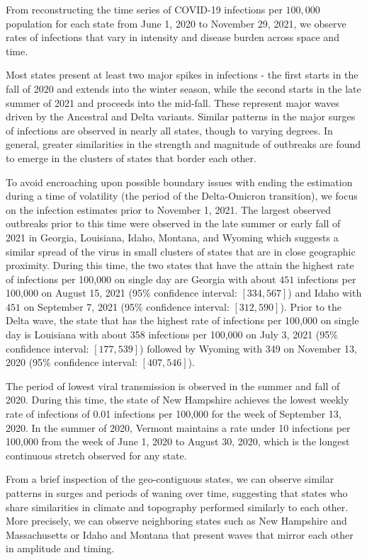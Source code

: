 \documentclass{article}
\begin{document}
From reconstructing the time series of COVID-19 infections per $100,000$
population for each \US state from June 1, 2020 to November 29, 2021, we
observe rates of infections that vary in intensity and disease burden across
space and time. 

Most states present at least two major spikes in infections - the first starts
in the fall of 2020 and extends into the winter season, while the second starts
in the late summer of 2021 and proceeds into the mid-fall. These represent major
waves driven by the Ancestral and Delta variants. Similar patterns in the major
surges of infections are observed in nearly all states, though to varying
degrees. In general, greater similarities in the strength and magnitude of
outbreaks are found to emerge in the clusters of states that border each other.

To avoid encroaching upon possible boundary issues with ending the estimation
during a time of volatility (the period of the Delta-Omicron transition), we
focus on the infection estimates prior to November 1, 2021. The largest observed
outbreaks prior to this time were observed in the late summer or early fall of
2021 in Georgia, Louisiana, Idaho, Montana, and Wyoming which suggests a similar
spread of the virus in small clusters of states that are in close geographic
proximity. During this time, the two states that have the attain the highest
rate of infections per 100,000 on single day are Georgia with about $451$
infections per 100,000 on August 15, 2021 (95\% confidence interval: $[334,
567]$) and Idaho with $451$ on September 7, 2021 (95\% confidence interval:
$[312, 590]$). Prior to the Delta wave, the state that has the highest rate of infections per
100,000 on single day is Louisiana with about 358 infections per 100,000 on July
3, 2021 (95\% confidence interval: $[177, 539]$) followed by Wyoming with 349
on November 13, 2020 (95\% confidence interval: $[407, 546]$).

The period of lowest viral transmission is observed in the summer and fall of
2020. During this time, the state of New Hampshire achieves the lowest weekly
rate of infections of 0.01 infections per 100,000 for the week of September 13,
2020. In the summer of 2020, Vermont maintains a rate under 10 infections per
100,000 from the week of June 1, 2020 to August 30, 2020, which is the longest
continuous stretch observed for any state.

From a brief inspection of the geo-contiguous states, we can observe similar
patterns in surges and periods of waning over time, suggesting that states who
share similarities in climate and topography performed similarly to each other.
More precisely, we can observe neighboring states such as New Hampshire and
Massachusetts or Idaho and Montana that present waves that mirror each other in
amplitude and timing. 
\end{document}
